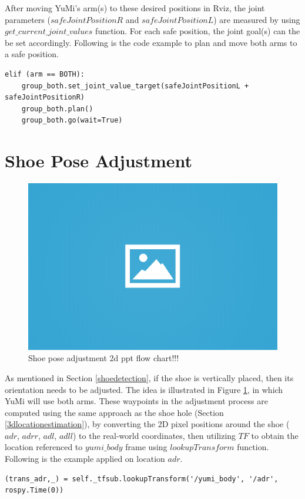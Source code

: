 After moving YuMi's arm(s) to these desired positions in Rviz, the joint parameters ($safeJointPositionR$ and $safeJointPositionL$) are measured by using $get\_current\_joint\_values$ function. For each safe position, the joint goal(s) can the be set accordingly. Following is the code example to plan and move both arms to a safe position.

\begin{verbatim}
elif (arm == BOTH):
    group_both.set_joint_value_target(safeJointPositionL + safeJointPositionR)
    group_both.plan()
    group_both.go(wait=True)
\end{verbatim}

\section{Shoe Pose Adjustment} \label{adj}

\begin{figure}[H]
\centering
\includegraphics[width = 0.5\columnwidth]{images/ph.png}
\caption{Shoe pose adjustment 2d ppt flow chart!!!}
\label{adjust}
\end{figure}

As mentioned in Section \ref{shoedetection}, if the shoe is vertically placed, then its orientation needs to be adjusted. The idea is illustrated in Figure \ref{adjust}, in which YuMi will use both arms. These waypoints in the adjustment process are computed using the same approach as the shoe hole (Section \ref{3dlocationestimation}), by converting the 2D pixel positions around the shoe ($adr$, $adrr$, $adl$, $adll$) to the real-world coordinates, then utilizing $TF$ to obtain the location referenced to $yumi\_body$ frame using $lookupTransform$ function. Following is the example applied on location $adr$.

\begin{verbatim}
(trans_adr,_) = self._tfsub.lookupTransform('/yumi_body', '/adr', rospy.Time(0))
\end{verbatim}

